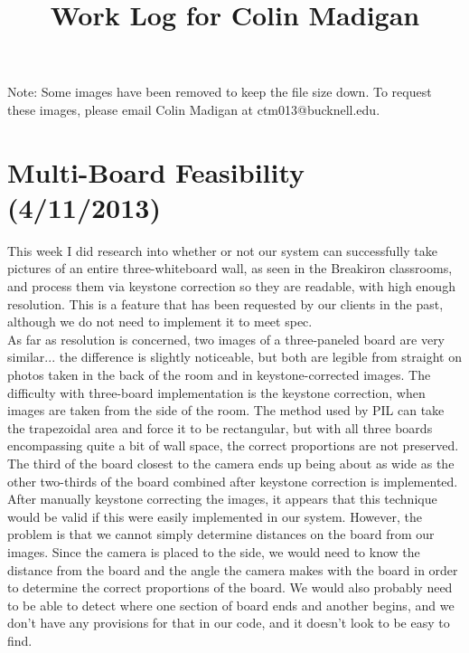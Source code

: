 \documentclass[]{article}
\begin{document}
\title{Work Log for Colin Madigan}
\date{}
\maketitle
	\tableofcontents
\newpage

Note: Some images have been removed to keep the file size down.  To request these images, please email Colin Madigan at ctm013@bucknell.edu.

	\section{Multi-Board Feasibility (4/11/2013)}

	This week I did research into whether or not our system can successfully take pictures of an entire three-whiteboard wall, as seen in the Breakiron classrooms, and process them via keystone correction so they are readable, with high enough resolution.  This is a feature that has been requested by our clients in the past, although we do not need to implement it to meet spec.\\

As far as resolution is concerned, two images of a three-paneled board are very similar... the difference is slightly noticeable, but both are legible from straight on photos taken in the back of the room and in keystone-corrected images.  The difficulty with three-board implementation is the keystone correction, when images are taken from the side of the room.  The method used by PIL can take the trapezoidal area and force it to be rectangular, but with all three boards encompassing quite a bit of wall space, the correct proportions are not preserved.  The third of the board closest to the camera ends up being about as wide as the other two-thirds of the board combined after keystone correction is implemented.  \\

After manually keystone correcting the images, it appears that this technique would be valid if this were easily implemented in our system.  However, the problem is that we cannot simply determine distances on the board from our images.  Since the camera is placed to the side, we would need to know the distance from the board and the angle the camera makes with the board in order to determine the correct proportions of the board.  We would also probably need to be able to detect where one section of board ends and another begins, and we don't have any provisions for that in our code, and it doesn't look to be easy to find.  \\
\end{document}

